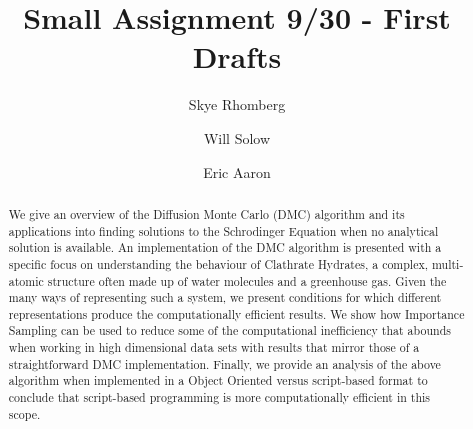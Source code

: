 \documentclass[journal=jacsat,manuscript=article]{achemso}
\author{Skye Rhomberg}
\author{Will Solow}
\author{Eric Aaron}
\affiliation[Colby College]
{Department of Computer Science, Colby College, Waterville, ME}
\title[An \textsf{achemso} demo]
  {Small Assignment 9/30 - First Drafts}
\begin{document}
%
%
%
%
%

\begin{abstract}
We give an overview of the Diffusion Monte Carlo (DMC) algorithm and its applications into finding solutions to the Schrodinger Equation when no analytical solution is available. An implementation of the DMC algorithm is presented with a specific focus on understanding the behaviour of Clathrate Hydrates, a complex, multi-atomic structure often made up of water molecules and a greenhouse gas. Given the many ways of representing such a system, we present conditions for which different representations produce the computationally efficient results. We show how Importance Sampling can be used to reduce some of the computational inefficiency that abounds when working in high dimensional data sets with results that mirror those of a straightforward DMC implementation. Finally, we provide an analysis of the above algorithm when implemented in a Object Oriented versus script-based format to conclude that script-based programming is more computationally efficient in this scope.
\end{abstract}
\end{document}

